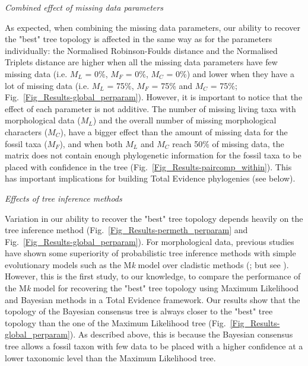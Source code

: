 \documentclass[12pt,letterpaper]{article}
\renewcommand{\subsection}[1]{%
\bigskip
\begin{center}
\begin{large}
\normalfont\itshape #1
\end{large}
\end{center}}
\begin{document}
\subsection{Combined effect of missing data parameters}
As expected, when combining the missing data parameters, our ability to recover the "best" tree topology is affected in the same way as for the parameters individually: the Normalised Robinson-Foulds distance and the Normalised Triplets distance are higher when all the missing data parameters have few missing data (i.e. $M_{L}$ = 0\%, $M_{F}$ = 0\%, $M_{C}$ = 0\%) and lower when they have a lot of missing data (i.e. $M_{L}$ = 75\%, $M_{F}$ = 75\% and $M_{C}$ = 75\%; Fig.~\ref{Fig_Results-global_perparam}). However, it is important to notice that the effect of each parameter is not additive. The number of missing living taxa with morphological data ($M_{L}$) and the overall number of missing morphological characters ($M_{C}$), have a bigger effect than the amount of missing data for the fossil taxa ($M_{F}$), and when both $M_{L}$ and $M_{C}$ reach 50\% of missing data, the matrix does not contain enough phylogenetic information for the fossil taxa to be placed with confidence in the tree (Fig.~\ref{Fig_Results-paircomp_within}). This has important implications for building Total Evidence phylogenies (see below).

\subsection{Effects of tree inference methods}
Variation in our ability to recover the "best" tree topology depends heavily on the tree inference method (Fig.~\ref{Fig_Results-permeth_perparam} and Fig.~\ref{Fig_Results-global_perparam}). For morphological data, previous studies have shown some superiority of probabilistic tree inference methods with simple evolutionary models such as the M\textit{k} model \citep{lewisa2001} over cladistic methods (\citealt{wrightbayesian2014}; but see \citealt{spencerefficacy2013}). However, this is the first study, to our knowledge, to compare the performance of the M\textit{k} model \citep{lewisa2001} for recovering the "best" tree topology using Maximum Likelihood and Bayesian methods in a Total Evidence framework. Our results show that the topology of the Bayesian consensus tree is always closer to the "best" tree topology than the one of the Maximum Likelihood tree (Fig.~\ref{Fig_Results-global_perparam}). As described above, this is because the Bayesian consensus tree allows a fossil taxon with few data to be placed with a higher confidence at a lower taxonomic level than the Maximum Likelihood tree. 
\end{document}
